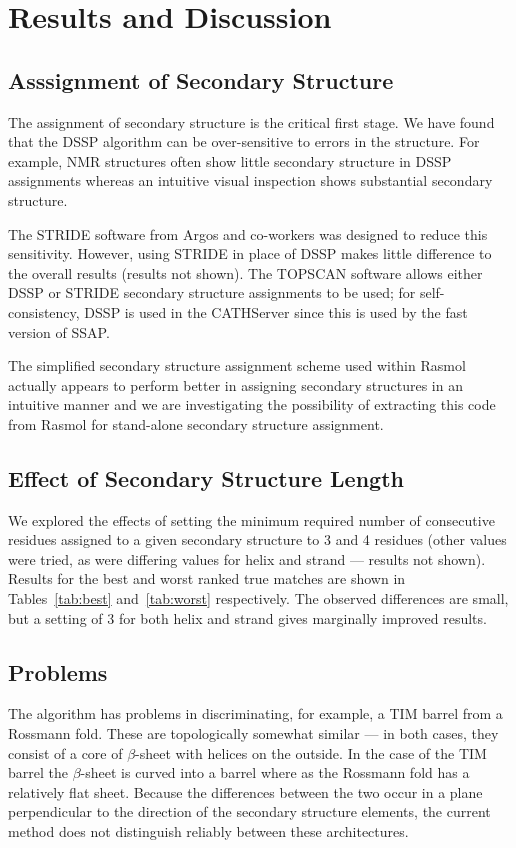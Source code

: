 \documentclass{article}
\begin{document}
\section{Results and Discussion}



%

\subsection{Asssignment of Secondary Structure}
The assignment of secondary structure is the critical first stage. We
have found that the DSSP algorithm can be over-sensitive to errors in
the structure. For example, NMR structures often show little secondary
structure in DSSP assignments whereas an intuitive visual inspection
shows substantial secondary structure. 

The STRIDE software from Argos and co-workers was designed to reduce
this sensitivity. However, using STRIDE in place of DSSP makes little
difference to the overall results (results not shown). The TOPSCAN
software allows either DSSP or STRIDE secondary structure assignments
to be used; for self-consistency, DSSP is used in the CATHServer
since this is used by the fast version of SSAP.

The simplified secondary structure assignment scheme used within
Rasmol actually appears to perform better in assigning secondary
structures in an intuitive manner and we are investigating the
possibility of extracting this code from Rasmol for stand-alone
secondary structure assignment.

\subsection{Effect of Secondary Structure Length}
We explored the effects of setting the minimum required number of
consecutive residues assigned to a given secondary structure to 3 and
4 residues (other values were tried, as were differing values for
helix and strand --- results not shown). Results for the best and
worst ranked true matches are shown in Tables~\ref{tab:best}
and~\ref{tab:worst} respectively. The observed differences are small,
but a setting of 3 for both helix and strand gives marginally improved
results. 

\subsection{Problems}
The algorithm has problems in discriminating, for example, a TIM
barrel from a Rossmann fold. These are topologically somewhat similar
--- in both cases, they consist of a core of $\beta$-sheet with
helices on the outside. In the case of the TIM barrel the
$\beta$-sheet is curved into a barrel where as the Rossmann fold has a
relatively flat sheet. Because the differences between the two occur
in a plane perpendicular to the direction of the secondary structure
elements, the current method does not distinguish reliably between these
architectures. 
\end{document}
